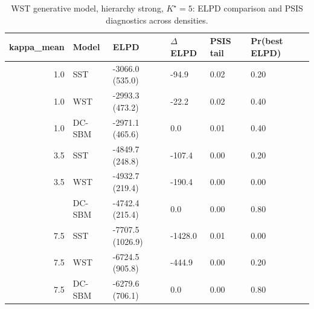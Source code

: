 \begin{table}
\centering
\caption{WST generative model, hierarchy strong, $K^\star=5$: ELPD comparison and PSIS diagnostics across densities.}
\centering
\begin{tabular}[t]{rlllll}
\toprule
kappa_mean & Model & ELPD & $\Delta$ELPD & PSIS tail & Pr(best ELPD)\\
\midrule
1.0 & SST & -3066.0 (535.0) & -94.9 & 0.02 & 0.20\\
1.0 & WST & -2993.3 (473.2) & -22.2 & 0.02 & 0.40\\
1.0 & DC-SBM & -2971.1 (465.6) & 0.0 & 0.01 & 0.40\\
3.5 & SST & -4849.7 (248.8) & -107.4 & 0.00 & 0.20\\
3.5 & WST & -4932.7 (219.4) & -190.4 & 0.00 & 0.00\\
\addlinespace
3.5 & DC-SBM & -4742.4 (215.4) & 0.0 & 0.00 & 0.80\\
7.5 & SST & -7707.5 (1026.9) & -1428.0 & 0.01 & 0.00\\
7.5 & WST & -6724.5 (905.8) & -444.9 & 0.00 & 0.20\\
7.5 & DC-SBM & -6279.6 (706.1) & 0.0 & 0.00 & 0.80\\
\bottomrule
\end{tabular}
\end{table}
